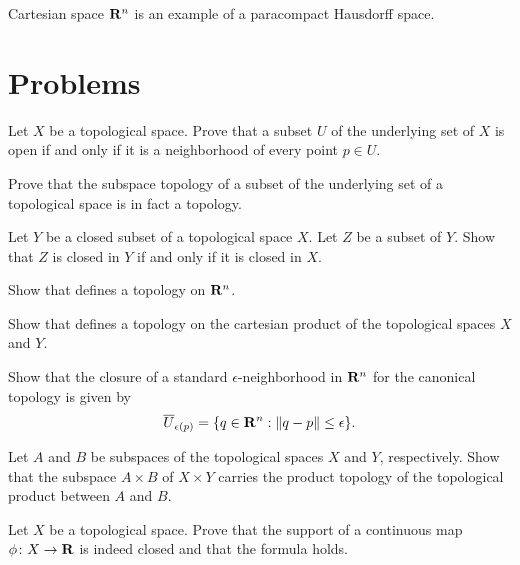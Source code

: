 Cartesian space $\mathbf{R}^n$ is an example of a paracompact Hausdorff space.

\section{Problems}

\begin{xca}
  Let $X$ be a topological space. Prove that a subset $U$ of the underlying set
  of $X$ is open if and only if it is a neighborhood of every point $p \in U$.
\end{xca}

\begin{xca}
  Prove that the subspace topology of a subset of the underlying set of a topological
  space is in fact a topology.
\end{xca}

\begin{xca}
  Let $Y$ be a closed subset of a topological space $X$. Let $Z$ be a subset of
  $Y$. Show that $Z$ is closed in $Y$ if and only if it is closed in $X$.
\end{xca}

\begin{xca}
  Show that  defines a topology on $\mathbf{R}^n$.
\end{xca}

\begin{xca}
  Show that  defines a topology on the cartesian
  product of the topological spaces $X$ and $Y$.
\end{xca}

\begin{xca}
  Show that the closure of a standard $\epsilon$-neighborhood in $\mathbf{R}^n$
  for the canonical topology is given by
  \begin{equation}
    \overline U_{\epsilon(p)} = \lbrace q \in \mathbf{R}^n : \lVert q - p\rVert \leq \epsilon\rbrace.
  \end{equation}
\end{xca}

\begin{xca}
  Let $A$ and $B$ be subspaces of the topological spaces $X$ and $Y$, respectively.
  Show that the subspace $A \times B$ of $X \times Y$ carries the
  product topology of the topological product between $A$ and $B$.
\end{xca}

\begin{xca}
  Let $X$ be a topological space. Prove that the support of a continuous map
  $\phi\colon X \to \mathbf{R}$ is indeed closed and that the formula 
  holds.
\end{xca}

